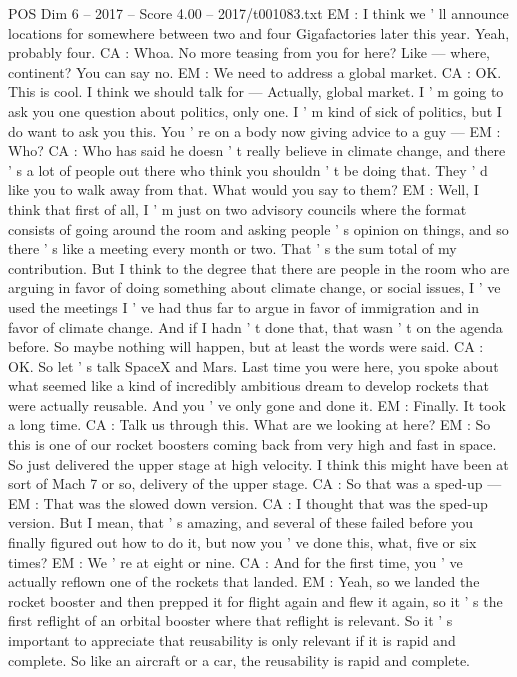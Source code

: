 \begin{textsample}{POS Dim 6 – 2017 – Score 4.00 – 2017/t001083.txt}
EM : I think we ' ll announce locations for somewhere between two and four Gigafactories later this year.
Yeah, probably four.
CA : Whoa.
No more teasing from you for here?
Like — where, continent?
You can say no.
EM : We need to address a global market.
CA : OK.
This is cool.
I think we should talk for — Actually, global market.
I ' m going to ask you one question about politics, only one.
I ' m kind of sick of politics, but I do want to ask you this.
You ' re on a body now giving advice to a guy — EM : Who?
CA : Who has said he doesn ' t really believe in climate change, and there ' s a lot of people out there who think you shouldn ' t be doing that.
They ' d like you to walk away from that.
What would you say to them?
EM : Well, I think that first of all, I ' m just on two advisory councils where the format consists of going around the room and asking people ' s opinion on things, and so there ' s like a meeting every month or two.
That ' s the sum total of my contribution.
But I think to the degree that there are people in the room who are arguing in favor of doing something about climate change, or social issues, I ' ve used the meetings I ' ve had thus far to argue in favor of immigration and in favor of climate change.
And if I hadn ' t done that, that wasn ' t on the agenda before.
So maybe nothing will happen, but at least the words were said.
CA : OK.
So let ' s talk SpaceX and Mars.
Last time you were here, you spoke about what seemed like a kind of incredibly ambitious dream to develop rockets that were actually reusable.
And you ' ve only gone and done it.
EM : Finally.
It took a long time.
CA : Talk us through this.
What are we looking at here?
EM : So this is one of our rocket boosters coming back from very high and fast in space.
So just delivered the upper stage at high velocity.
I think this might have been at sort of Mach 7 or so, delivery of the upper stage.
CA : So that was a sped-up — EM : That was the slowed down version.
CA : I thought that was the sped-up version.
But I mean, that ' s amazing, and several of these failed before you finally figured out how to do it, but now you ' ve done this, what, five or six times?
EM : We ' re at eight or nine.
CA : And for the first time, you ' ve actually reflown one of the rockets that landed.
EM : Yeah, so we landed the rocket booster and then prepped it for flight again and flew it again, so it ' s the first reflight of an orbital booster where that reflight is relevant.
So it ' s important to appreciate that reusability is only relevant if it is rapid and complete.
So like an aircraft or a car, the reusability is rapid and complete.

\end{textsample}
